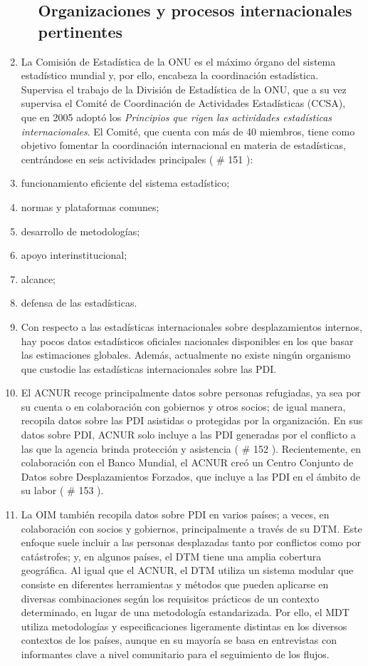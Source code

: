 \documentclass[
]{book}
\begin{document}
\begin{enumerate}
\begin{enumerate}
{    \subsection{Organizaciones y procesos internacionales pertinentes}\label{organizaciones-y-procesos-internacionales-pertinentes}}
  \end{enumerate}
\item
  La Comisión de Estadística de la ONU es el máximo órgano del sistema estadístico mundial y, por ello, encabeza la coordinación estadística. Supervisa el trabajo de la División de Estadística de la ONU, que a su vez supervisa el Comité de Coordinación de Actividades Estadísticas (CCSA), que en 2005 adoptó los \emph{Principios que rigen las actividades estadísticas internacionales}. El Comité, que cuenta con más de 40 miembros, tiene como objetivo fomentar la coordinación internacional en materia de estadísticas, centrándose en seis actividades principales (
  \# 151
  ):
\item
  funcionamiento eficiente del sistema estadístico;
\item
  normas y plataformas comunes;
\item
  desarrollo de metodologías;
\item
  apoyo interinstitucional;
\item
  alcance;
\item
  defensa de las estadísticas.
\item
  Con respecto a las estadísticas internacionales sobre desplazamientos internos, hay pocos datos estadísticos oficiales nacionales disponibles en los que basar las estimaciones globales. Además, actualmente no existe ningún organismo que custodie las estadísticas internacionales sobre las PDI.
\item
  El ACNUR recoge principalmente datos sobre personas refugiadas, ya sea por su cuenta o en colaboración con gobiernos y otros socios; de igual manera, recopila datos sobre las PDI asistidas o protegidas por la organización. En sus datos sobre PDI, ACNUR solo incluye a las PDI generadas por el conflicto a las que la agencia brinda protección y asistencia (
  \# 152
  ). Recientemente, en colaboración con el Banco Mundial, el ACNUR creó un Centro Conjunto de Datos sobre Desplazamientos Forzados, que incluye a las PDI en el ámbito de su labor (
  \# 153
  ).
\item
  La OIM también recopila datos sobre PDI en varios países; a veces, en colaboración con socios y gobiernos, principalmente a través de su DTM. Este enfoque suele incluir a las personas desplazadas tanto por conflictos como por catástrofes; y, en algunos países, el DTM tiene una amplia cobertura geográfica. Al igual que el ACNUR, el DTM utiliza un sistema modular que consiste en diferentes herramientas y métodos que pueden aplicarse en diversas combinaciones según los requisitos prácticos de un contexto determinado, en lugar de una metodología estandarizada. Por ello, el MDT utiliza metodologías y especificaciones ligeramente distintas en los diversos contextos de los países, aunque en su mayoría se basa en entrevistas con informantes clave a nivel comunitario para el seguimiento de los flujos.

\end{enumerate}
\end{document}
